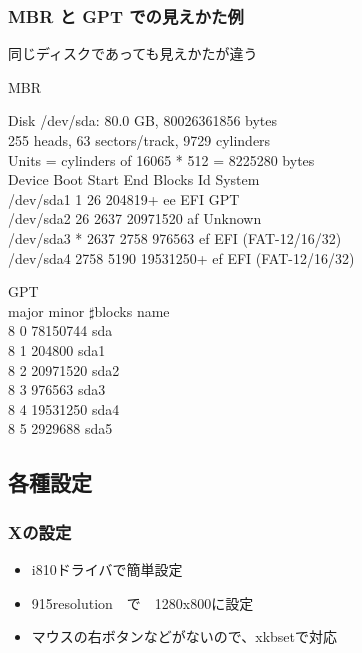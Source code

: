 \documentclass[cjk,dvipdfmx]{beamer}
\begin{document}
\begin{frame}
\frametitle{MBR と GPT での見えかた例}
同じディスクであっても見えかたが違う\\
\begin{minipage}[t]{0.68\hsize} 
MBR

{\scriptsize
 Disk /dev/sda: 80.0 GB, 80026361856 bytes\\
255 heads, 63 sectors/track, 9729 cylinders\\
Units = cylinders of 16065 * 512 = 8225280 bytes\\

   Device Boot      Start         End      Blocks   Id  System\\
/dev/sda1               1          26      204819+  ee  EFI GPT\\
/dev/sda2              26        2637    20971520   af  Unknown\\
/dev/sda3   *        2637        2758      976563   ef  EFI (FAT-12/16/32)\\
/dev/sda4            2758        5190    19531250+  ef  EFI (FAT-12/16/32)\\
}
\end{minipage}
\begin{minipage}[t]{0.30\hsize}
GPT\\

{\small
 major minor  $\sharp{}$blocks  name\\

   8     0   78150744 sda\\
   8     1     204800 sda1\\
   8     2   20971520 sda2\\
   8     3     976563 sda3\\
   8     4   19531250 sda4\\
   8     5    2929688 sda5\\
}
\end{minipage}
\end{frame}

\subsection{各種設定}

\begin{frame}
 \frametitle{Xの設定}
\begin{itemize}
 \item i810ドライバで簡単設定
 \item 915resolution　で　1280x800に設定
 \item マウスの右ボタンなどがないので、xkbsetで対応
\end{itemize}
\end{frame}
\end{document}
